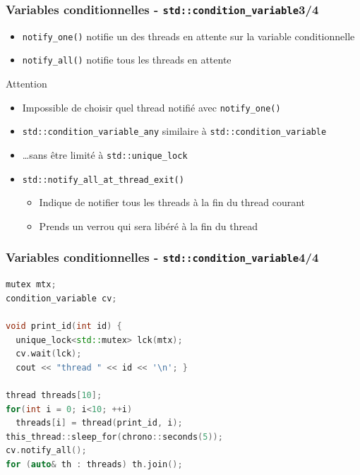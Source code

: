 \documentclass[C++.tex]{subfiles}
\begin{document}
\begin{frame}[fragile]
	\frametitle{Variables conditionnelles - \lstinline|std::condition_variable|\titlehfill{}3/4}
	\begin{itemize}
		\item \lstinline|notify_one()| notifie un des threads en attente sur la variable conditionnelle
		\item \lstinline|notify_all()| notifie tous les threads en attente
	\end{itemize}

	\begin{alertblock}{Attention}
		\begin{itemize}
			\item Impossible de choisir quel thread notifié avec \lstinline|notify_one()|
		\end{itemize}
	\end{alertblock}

	\begin{itemize}
		\item \lstinline|std::condition_variable_any| similaire à \lstinline|std::condition_variable|
		\item \ldots{}sans être limité à \lstinline|std::unique_lock|
		\item \lstinline|std::notify_all_at_thread_exit()| 
		\begin{itemize}
			\item Indique de notifier tous les threads à la fin du thread courant
			\item Prends un verrou qui sera libéré à la fin du thread
		\end{itemize}
	\end{itemize}
\end{frame}

\begin{frame}[fragile]
	\frametitle{Variables conditionnelles - \lstinline|std::condition_variable|\titlehfill{}4/4}
	\begin{lstlisting}[language=C++]
mutex mtx;
condition_variable cv;

void print_id(int id) {
  unique_lock<std::mutex> lck(mtx);
  cv.wait(lck);
  cout << "thread " << id << '\n'; }

thread threads[10];
for(int i = 0; i<10; ++i)
  threads[i] = thread(print_id, i);
this_thread::sleep_for(chrono::seconds(5));
cv.notify_all();
for (auto& th : threads) th.join();\end{lstlisting}
\end{frame}
\end{document}

